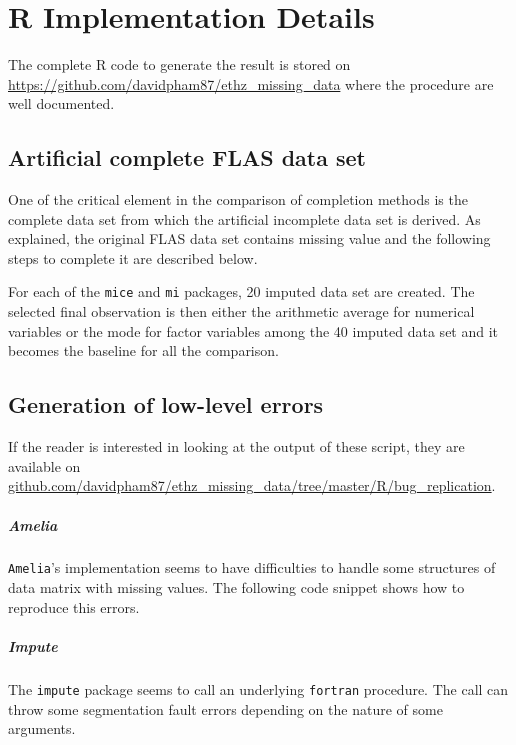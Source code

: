 \chapter{R Implementation Details}
\label{app:complement}

The complete \textsf{R} code to generate the result is stored on
\url{https://github.com/davidpham87/ethz\_missing\_data} where the procedure
are well documented.

\section{Artificial complete FLAS data set}

One of the critical element in the comparison of completion methods is the
complete data set from which the artificial incomplete data set is derived. As
explained, the original FLAS data set contains missing value and the following
steps to complete it are described below.

For each of the \texttt{mice} and \texttt{mi} packages, 20 imputed data set are
created. The selected final observation is then either the arithmetic average
for numerical variables or the mode for factor variables among the 40 imputed
data set and it becomes the baseline for all the comparison.



\section{Generation of low-level errors}

If the reader is interested in looking at the output of these script, they are
available on
\url{github.com/davidpham87/ethz_missing_data/tree/master/R/bug_replication}.

\paragraph{Amelia}

\texttt{Amelia}'s implementation seems to have difficulties to handle some
structures of data matrix with missing values. The following code snippet shows
how to reproduce this errors.



\paragraph{Impute}

The \texttt{impute} package seems to call an underlying \texttt{fortran}
procedure. The call can throw some segmentation fault errors depending on
the nature of some arguments.



